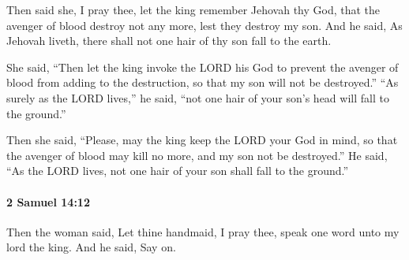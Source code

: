 			\begin{versebox}
					\item[BHS] 
					\item[ASV] Then said she, I pray thee, let the king remember Jehovah thy God, that the avenger of blood destroy not any more, lest they destroy my son. And he said, As Jehovah liveth, there shall not one hair of thy son fall to the earth.
					\item[NIV] She said, “Then let the king invoke the LORD his God to prevent the avenger of blood from adding to the destruction, so that my son will not be destroyed.” “As surely as the LORD lives,” he said, “not one hair of your son’s head will fall to the ground.”
					\item[NRSV] Then she said, “Please, may the king keep the LORD your God in mind, so that the avenger of blood may kill no more, and my son not be destroyed.” He said, “As the LORD lives, not one hair of your son shall fall to the ground.”
			\end{versebox}

		\paragraph{2 Samuel 14:12} %
			\label{2SAMUEL-14-12}

			Then the woman said, Let thine handmaid, I pray thee, speak one word unto my lord the king. And he said, Say on.

